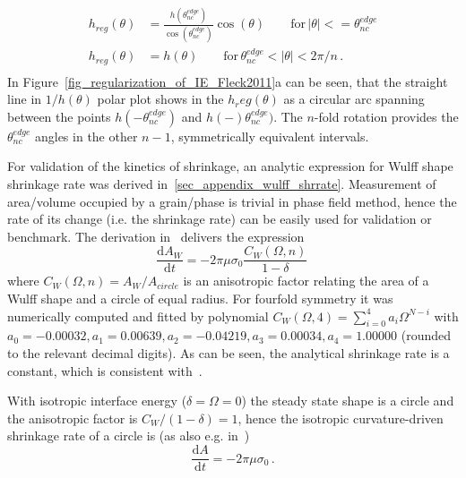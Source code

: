\begin{equation}
	\begin{split}
		h_{reg}(\theta) &= \frac{h(\theta_{nc}^{edge})}{\cos(\theta_{nc}^{edge})}\cos(\theta)  \qquad \mathrm{for} \, |\theta| <= \theta_{nc}^{edge} \\
		h_{reg}(\theta) &= h(\theta) \qquad \mathrm{for} \, \theta_{nc}^{edge}< |\theta| < 2\pi/n \,.\\
	\end{split}
\end{equation}
In Figure~\ref{fig_regularization_of_IE_Fleck2011}a can be seen, that the straight line in $1/h(\theta)$ polar plot shows in the $h_reg(\theta)$ as a circular arc spanning between the points $h(-\theta_{nc}^{edge})$ and $h(-)\theta_{nc}^{edge})$. The $n$-fold rotation provides the $\theta_{nc}^{edge}$ angles in the other $n-1$, symmetrically equivalent intervals.

For validation of the kinetics of shrinkage, an analytic expression for Wulff shape shrinkage rate was derived in~\ref{sec_appendix_wulff_shrrate}. Measurement of area/volume occupied by a grain/phase is trivial in phase field method, hence the rate of its change (i.e. the shrinkage rate) can be easily used for validation or benchmark. The derivation in~\cite{Minar2021suppl} delivers the expression
\begin{equation}\label{eq_wulff_shrrate}
	\frac{\mathrm{d}A_W}{\mathrm{d}t} = -2\pi\mu\sigma_0  \frac{C_W(\Omega,n)}{1-\delta} \,
\end{equation}
where $C_W(\Omega,n)=A_W/A_{circle}$ is an anisotropic factor relating the area of a Wulff shape and a circle of equal radius. For fourfold symmetry it was numerically computed and fitted by polynomial $C_W(\Omega,4)= \sum_{i=0}^4a_i\Omega^{N-i}$ with $a_0=-0.00032 ,a_1=0.00639 ,a_2=-0.04219 , a_3=0.00034 , a_4=1.00000$ (rounded to the relevant decimal digits). As can be seen, the analytical shrinkage rate is a constant, which is consistent with~\cite{Taylor1998}.

With isotropic interface energy ($\delta=\Omega=0$) the steady state shape is a circle and the anisotropic factor is $C_W/(1-\delta)=1$, hence the isotropic curvature-driven shrinkage rate of a circle is (as also e.g. in~\cite{Moelans2009})
\begin{equation} \label{eq_iso_shrrate}
	\frac{\mathrm{d}A}{\mathrm{d}t} = -2\pi\mu\sigma_0 \,.
\end{equation}


